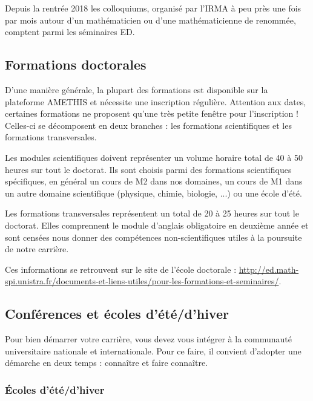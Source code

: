 \documentclass[a5paper]{article}
\begin{document}
Depuis la rentrée 2018 les colloquiums, organisé par l'IRMA à peu près une fois par mois autour d'un mathématicien ou d'une mathématicienne de renommée, comptent parmi les séminaires ED.

\subsection{Formations doctorales}
\label{subsec:form-doct}

D'une manière générale, la plupart des formations est disponible sur la plateforme AMETHIS et nécessite une inscription régulière. Attention aux dates, certaines formations ne proposent qu'une très petite fenêtre pour l'inscription ! Celles-ci se décomposent en deux branches : les formations scientifiques et les formations transversales.


\medskip

Les modules scientifiques doivent représenter un volume horaire total de 40 à 50 heures sur tout le doctorat. Ils sont choisis parmi des formations scientifiques spécifiques, en général un cours de M2 dans nos domaines, un cours de M1 dans un autre domaine scientifique (physique, chimie, biologie, ...) ou une école d'été.

\medskip

Les formations transversales représentent un total de 20 à 25 heures sur tout le doctorat. Elles comprennent le module d'anglais obligatoire en deuxième année et sont censées nous donner des compétences non-scientifiques utiles à la poursuite de notre carrière.

\medskip

Ces informations se retrouvent sur le site de l'école doctorale : \href{http://ed.math-spi.unistra.fr/documents-et-liens-utiles/pour-les-formations-et-seminaires/}{http://ed.math-spi.unistra.fr/documents-et-liens-utiles/pour-les-formations-et-seminaires/}.

\subsection{Conférences et écoles d'été/d'hiver}
\label{subsec:conf-ecoledete}

Pour bien démarrer votre carrière, vous devez vous intégrer à la
communauté universitaire nationale et internationale. Pour ce faire, il convient d'adopter une démarche en deux temps : connaître et faire connaître.

\subsubsection{\'Ecoles d'été/d'hiver}
\label{subsubsec:ecoledete}
\end{document}
